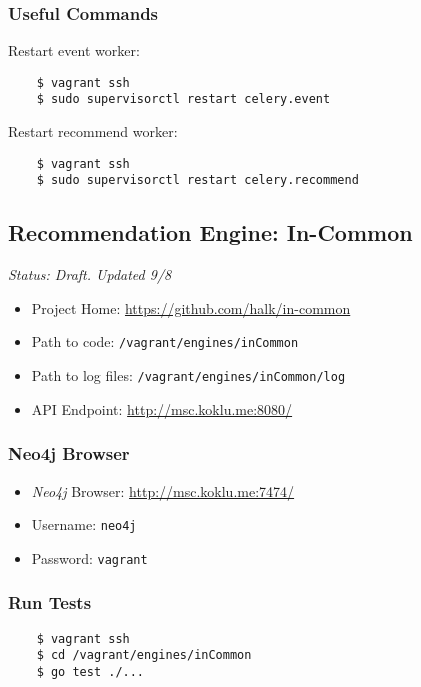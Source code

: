 \subsubsection{Useful Commands}

Restart event worker:

\begin{verbatim}
    $ vagrant ssh
    $ sudo supervisorctl restart celery.event
\end{verbatim}

Restart recommend worker:

\begin{verbatim}
    $ vagrant ssh
    $ sudo supervisorctl restart celery.recommend
\end{verbatim}


\subsection{Recommendation Engine: In-Common}

\emph{Status: Draft. Updated 9/8}

\begin{itemize}
\item Project Home: \url{https://github.com/halk/in-common}
\item Path to code: \texttt{/vagrant/engines/inCommon}
\item Path to log files: \texttt{/vagrant/engines/inCommon/log}
\item API Endpoint: \url{http://msc.koklu.me:8080/}
\end{itemize}

\subsubsection{Neo4j Browser}

\begin{itemize}
\item \emph{Neo4j} Browser: \url{http://msc.koklu.me:7474/}
\item Username: \texttt{neo4j}
\item Password: \texttt{vagrant}
\end{itemize}

\subsubsection{Run Tests}

\begin{verbatim}
    $ vagrant ssh
    $ cd /vagrant/engines/inCommon
    $ go test ./...
\end{verbatim}

